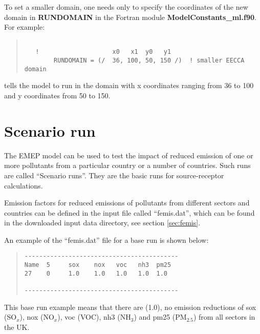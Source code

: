 To set a smaller domain, one needs only to specify the
coordinates of the new domain in {\bf RUNDOMAIN} in the Fortran module
 {\bf ModelConstants\_ml.f90}. For example:

\begin{quote}

\begin{verbatim}
  
   !                    x0   x1  y0   y1
        RUNDOMAIN = (/  36, 100, 50, 150 /)  ! smaller EECCA domain

\end{verbatim}
\end{quote}

tells the model to run in the domain with x coordinates ranging from
36 to 100 and y coordinates from 50 to 150.\\ 

\section{Scenario run}
\label{sec:scenrun}

The EMEP  model can be used to test the impact of reduced emission of
one or more pollutants from a particular country or a number of
countries.  Such runs are called ``Scenario runs''. They are the basic
runs for source-receptor calculations.


Emission factors for reduced emissions of pollutants from different
sectors and countries can be defined in the input file called
``femis.dat'', which can be found in the downloaded input data
directory, see section \ref{sec:femis}.

An example of the ``femis.dat'' file for a base run is shown below:
\begin{quote}

\begin{verbatim}
------------------------------------------
Name  5     sox    nox   voc   nh3  pm25
27    0     1.0    1.0   1.0   1.0  1.0  

------------------------------------------
\end{verbatim}
\end{quote}
\noindent
This base run example means that there are (1.0), no emission reductions of sox (SO$_x$),
nox (NO$_x$), voc (VOC), nh3 (NH$_3$) and pm25 (PM$_{2.5}$) from all
sectors in the UK. 

